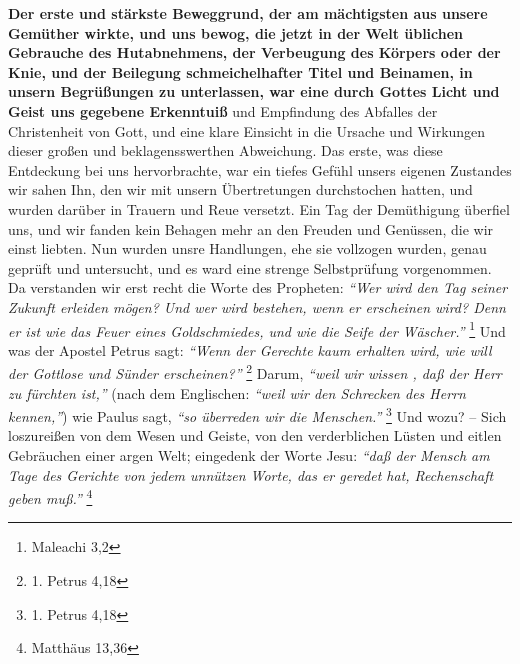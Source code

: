\textbf{Der erste und stärkste Beweggrund, der am mächtigsten aus unsere
Gemüther
wirkte, und uns bewog, die jetzt in der Welt üblichen Gebrauche des
Hutabnehmens, der Verbeugung des Körpers oder der Knie, und
der Beilegung
schmeichelhafter Titel und Beinamen, in unsern Begrüßungen zu unterlassen, war
eine durch Gottes Licht und Geist uns gegebene Erkenntuiß}
und Empfindung des
Abfalles der Christenheit von Gott, und eine klare Einsicht in die Ursache und
Wirkungen dieser großen und beklagensswerthen Abweichung. Das erste, was diese
Entdeckung bei uns hervorbrachte, war ein tiefes Gefühl unsers eigenen Zustandes
wir sahen Ihn, den wir mit unsern Übertretungen durchstochen hatten, und wurden
darüber in Trauern und Reue versetzt. Ein Tag der Demüthigung
überfiel uns, und
wir fanden kein Behagen mehr an den Freuden und Genüssen, die wir einst liebten.
Nun wurden unsre Handlungen, ehe sie vollzogen wurden, genau geprüft und
untersucht, und es ward eine strenge Selbstprüfung
vorgenommen. Da verstanden
wir erst recht die Worte des Propheten:
\textit{"`Wer wird den Tag seiner Zukunft
erleiden mögen? Und wer wird bestehen, wenn er erscheinen wird? Denn er ist wie
das Feuer eines Goldschmiedes, und wie die Seife der Wäscher."'}
\footnote{Maleachi 3,2}
Und was der Apostel Petrus sagt:
\textit{"`Wenn der Gerechte kaum erhalten wird, wie will der Gottlose und Sünder
erscheinen?"'}
\footnote{1. Petrus 4,18}
Darum,
\textit{"`weil wir wissen , daß der Herr zu fürchten ist,"'}
(nach dem Englischen:
\textit{"`weil wir den Schrecken des Herrn kennen,"'}) wie Paulus sagt,
\textit{"`so überreden wir die Menschen."'}
\footnote{1. Petrus 4,18}
Und wozu? -- Sich loszureißen von dem Wesen
und Geiste, von den verderblichen Lüsten und eitlen Gebräuchen einer argen Welt;
eingedenk der Worte Jesu:
\textit{"`daß der Mensch am Tage des Gerichte von jedem
unnützen Worte, das er geredet hat, Rechenschaft geben muß."'}
\footnote{Matthäus 13,36}

\medskip

